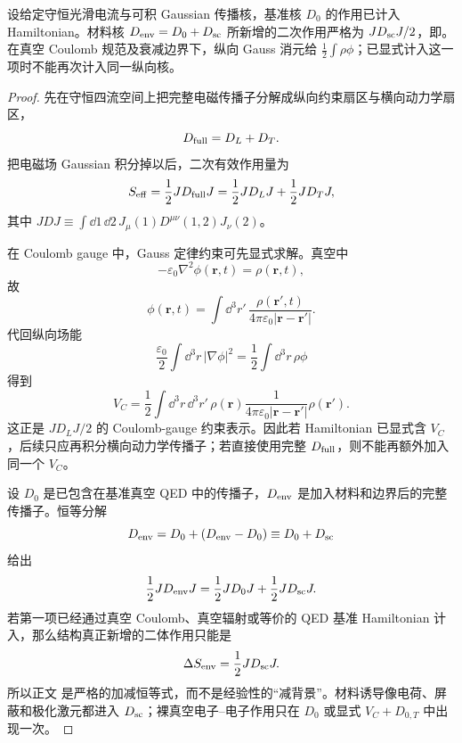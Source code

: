 \begin{proposition}
设给定守恒光滑电流与可积 Gaussian 传播核，基准核 $D_0$ 的作用已计入 Hamiltonian。材料核 $D_{\rm env}=D_0+D_{\rm sc}$ 所新增的二次作用严格为 $JD_{\rm sc}J/2$，即。在真空 Coulomb 规范及衰减边界下，纵向 Gauss 消元给 $\frac12\int\rho\phi$；已显式计入这一项时不能再次计入同一纵向核。
\end{proposition}
\begin{proof}
先在守恒四流空间上把完整电磁传播子分解成纵向约束扇区与横向动力学扇区，
\[
D_{\rm full}=D_L+D_T.
\]
把电磁场 Gaussian 积分掉以后，二次有效作用量为
\[
S_{\rm eff}=\frac12 JD_{\rm full}J
=\frac12 JD_LJ+\frac12 JD_TJ,
\]
其中 $JDJ\equiv\int\dd1\,\dd2\,J_\mu(1)D^{\mu\nu}(1,2)J_\nu(2)$。

在 Coulomb gauge 中，Gauss 定律约束可先显式求解。真空中
\[
-\varepsilon_0\nabla^2\phi(\mathbf r,t)=\rho(\mathbf r,t),
\]
故
\[
\phi(\mathbf r,t)
=\int\dd^3r'\,
\frac{\rho(\mathbf r',t)}{4\pi\varepsilon_0|\mathbf r-\mathbf r'|}.
\]
代回纵向场能
\[
\frac{\varepsilon_0}{2}\int\dd^3r\,|\nabla\phi|^2
=\frac12\int\dd^3r\,\rho\phi
\]
得到
\[
V_C
=\frac12\int\dd^3r\,\dd^3r'\,
\rho(\mathbf r)
\frac{1}{4\pi\varepsilon_0|\mathbf r-\mathbf r'|}
\rho(\mathbf r').
\]
这正是 $JD_LJ/2$ 的 Coulomb-gauge 约束表示。因此若 Hamiltonian 已显式含 $V_C$，后续只应再积分横向动力学传播子；若直接使用完整 $D_{\rm full}$，则不能再额外加入同一个 $V_C$。

设 $D_0$ 是已包含在基准真空 QED 中的传播子，$D_{\rm env}$ 是加入材料和边界后的完整传播子。恒等分解
\[
D_{\rm env}=D_0+(D_{\rm env}-D_0)\equiv D_0+D_{\rm sc}
\]
给出
\[
\frac12JD_{\rm env}J
=\frac12JD_0J+\frac12JD_{\rm sc}J.
\]
若第一项已经通过真空 Coulomb、真空辐射或等价的 QED 基准 Hamiltonian 计入，那么结构真正新增的二体作用只能是
\[
\Delta S_{\rm env}=\frac12JD_{\rm sc}J.
\]
所以正文 是严格的加减恒等式，而不是经验性的“减背景”。材料诱导像电荷、屏蔽和极化激元都进入 $D_{\rm sc}$；裸真空电子--电子作用只在 $D_0$ 或显式 $V_C+D_{0,T}$ 中出现一次。
\end{proof}



